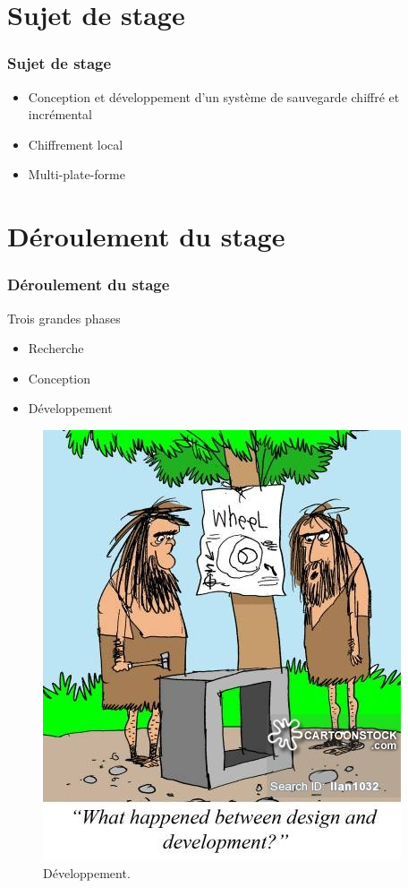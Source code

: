 \documentclass{beamer}
\begin{document}
\section{Sujet de stage}
\begin{frame}
 \frametitle{Sujet de stage}
 \begin{itemize}
  \item Conception et développement d'un système de sauvegarde 
  chiffré et incrémental
  \item Chiffrement local
  \item Multi-plate-forme
 \end{itemize}
\end{frame}

\section{Déroulement du stage}
\begin{frame}
 \frametitle{Déroulement du stage}
  \begin{minipage}{0.49\textwidth}
    Trois grandes phases
    \begin{itemize}
      \item Recherche
      \item Conception
      \item Développement
    \end{itemize}
  \end{minipage}
  \begin{minipage}{0.49\textwidth}
    \begin{figure}[h!]
      \centering
      \includegraphics[scale=0.23]{presentation/designAndDevelopment.jpeg}
      \caption{Développement.}
    \end{figure}
  \end{minipage}
\end{frame}
\end{document}
